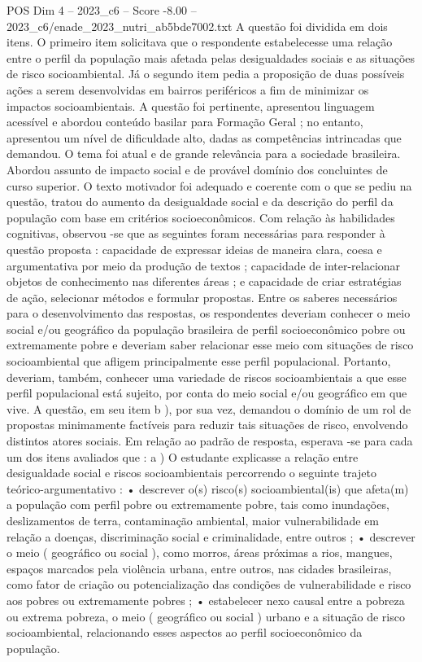\begin{textsample}{POS Dim 4 – 2023\_c6 – Score -8.00 – 2023\_c6/enade\_2023\_nutri\_ab5bde7002.txt}
A questão foi dividida em dois itens.
O primeiro item solicitava que o respondente estabelecesse uma relação entre o perfil da população mais afetada pelas desigualdades sociais e as situações de risco socioambiental.
Já o segundo item pedia a proposição de duas possíveis ações a serem desenvolvidas em bairros periféricos a fim de minimizar os impactos socioambientais.
A questão foi pertinente, apresentou linguagem acessível e abordou conteúdo basilar para Formação Geral ; no entanto, apresentou um nível de dificuldade alto, dadas as competências intrincadas que demandou.
O tema foi atual e de grande relevância para a sociedade brasileira.
Abordou assunto de impacto social e de provável domínio dos concluintes de curso superior.
O texto motivador foi adequado e coerente com o que se pediu na questão, tratou do aumento da desigualdade social e da descrição do perfil da população com base em critérios socioeconômicos.
Com relação às habilidades cognitivas, observou -se que as seguintes foram necessárias para responder à questão proposta : capacidade de expressar ideias de maneira clara, coesa e argumentativa por meio da produção de textos ; capacidade de inter-relacionar objetos de conhecimento nas diferentes áreas ; e capacidade de criar estratégias de ação, selecionar métodos e formular propostas.
Entre os saberes necessários para o desenvolvimento das respostas, os respondentes deveriam conhecer o meio social e/ou geográfico da população brasileira de perfil socioeconômico pobre ou extremamente pobre e deveriam saber relacionar esse meio com situações de risco socioambiental que afligem principalmente esse perfil populacional.
Portanto, deveriam, também, conhecer uma variedade de riscos socioambientais a que esse perfil populacional está sujeito, por conta do meio social e/ou geográfico em que vive.
A questão, em seu item b ), por sua vez, demandou o domínio de um rol de propostas minimamente factíveis para reduzir tais situações de risco, envolvendo distintos atores sociais.
Em relação ao padrão de resposta, esperava -se para cada um dos itens avaliados que : a ) O estudante explicasse a relação entre desigualdade social e riscos socioambientais percorrendo o seguinte trajeto teórico-argumentativo : • descrever o(s) risco(s) socioambiental(is) que afeta(m) a população com perfil pobre ou extremamente pobre, tais como inundações, deslizamentos de terra, contaminação ambiental, maior vulnerabilidade em relação a doenças, discriminação social e criminalidade, entre outros ; • descrever o meio ( geográfico ou social ), como morros, áreas próximas a rios, mangues, espaços marcados pela violência urbana, entre outros, nas cidades brasileiras, como fator de criação ou potencialização das condições de vulnerabilidade e risco aos pobres ou extremamente pobres ; • estabelecer nexo causal entre a pobreza ou extrema pobreza, o meio ( geográfico ou social ) urbano e a situação de risco socioambiental, relacionando esses aspectos ao perfil socioeconômico da população.

\end{textsample}
